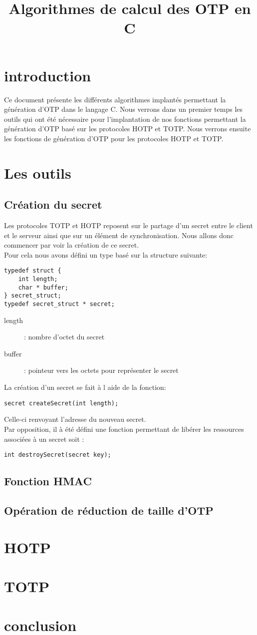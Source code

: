 \documentclass{../../res/univ-projet}
\title{Algorithmes de calcul des OTP en C}
\author{}
\begin{document}
\maketitle

\newpage
\tableofcontents
\newpage 

\section{introduction}
Ce document présente les différents algorithmes implantés permettant la 
génération d'OTP dans le langage C. Nous verrons dans un premier temps 
les outils qui ont été nécessaire pour l'implantation de nos fonctions permettant la 
génération d'OTP basé sur les protocoles HOTP et TOTP. Nous verrons ensuite
les fonctions de génération d'OTP pour les protocoles HOTP et TOTP.
\section{Les outils}
\subsection{Création du secret}
Les protocoles TOTP et HOTP reposent sur le partage d'un secret entre le client 
et le serveur ainsi que sur un élément de synchronisation. Nous allons donc commencer
par voir la création de ce secret.\\
Pour cela nous avons défini un type basé sur la structure suivante:
\begin{verbatim}
typedef struct {
    int length;
    char * buffer;
} secret_struct;
typedef secret_struct * secret;
\end{verbatim}
\begin{description}
\item [length]: nombre d'octet du secret
\item [buffer]: pointeur vers les octets pour représenter le secret
\end{description}
La création d'un secret se fait à l aide de la fonction:
\begin{verbatim}
secret createSecret(int length);
\end{verbatim}
Celle-ci renvoyant l'adresse du nouveau secret.\\
Par opposition, il à été défini une fonction permettant de libérer les
ressources associées à un secret soit :
\begin{verbatim}
int destroySecret(secret key);
\end{verbatim}



\subsection{Fonction HMAC}

\subsection{Opération de réduction de taille d'OTP}
\section{HOTP}
\section{TOTP}
\section{conclusion}
\end{document}
